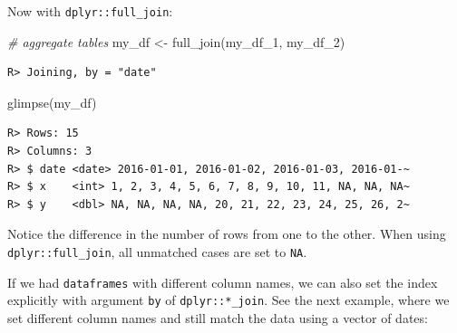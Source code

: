 \documentclass[
  12pt,
]{book}
\newenvironment{Shaded}{\begin{snugshade}}{\end{snugshade}}
\newcommand{\CommentTok}[1]{\textcolor[rgb]{0.37,0.37,0.37}{\textit{#1}}}
\newcommand{\FunctionTok}[1]{\textcolor[rgb]{0,0,0}{#1}}
\newcommand{\NormalTok}[1]{#1}
\newcommand{\OtherTok}[1]{\textcolor[rgb]{0.37,0.37,0.37}{#1}}
\begin{document}
Now with \texttt{dplyr::full\_join}:

\begin{Shaded}
\begin{Highlighting}[]
\CommentTok{\# aggregate tables}
\NormalTok{my\_df }\OtherTok{\textless{}{-}} \FunctionTok{full\_join}\NormalTok{(my\_df\_1, }
\NormalTok{                   my\_df\_2)}
\end{Highlighting}
\end{Shaded}

\begin{verbatim}
R> Joining, by = "date"
\end{verbatim}

\begin{Shaded}
\begin{Highlighting}[]
\FunctionTok{glimpse}\NormalTok{(my\_df)}
\end{Highlighting}
\end{Shaded}

\begin{verbatim}
R> Rows: 15
R> Columns: 3
R> $ date <date> 2016-01-01, 2016-01-02, 2016-01-03, 2016-01-~
R> $ x    <int> 1, 2, 3, 4, 5, 6, 7, 8, 9, 10, 11, NA, NA, NA~
R> $ y    <dbl> NA, NA, NA, NA, 20, 21, 22, 23, 24, 25, 26, 2~
\end{verbatim}

Notice the difference in the number of rows from one to the other. When using \texttt{dplyr::full\_join}, all unmatched cases are set to \texttt{NA}.

If we had \texttt{dataframes} with different column names, we can also set the index explicitly with argument \texttt{by} of \texttt{dplyr::*\_join}. See the next example, where we set different column names and still match the data using a vector of dates:
\end{document}
